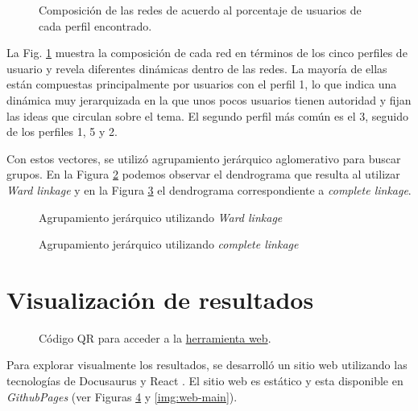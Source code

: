  \begin{figure}[htbp]
   \centering
   
    \caption{Composición de las redes de acuerdo al porcentaje de usuarios de cada perfil encontrado.}
    \label{fig:composition}
\end{figure}

La Fig. \ref{fig:composition} muestra la composición de cada red en términos de los cinco perfiles de usuario y revela diferentes dinámicas dentro de las redes. La mayoría de ellas están compuestas principalmente por usuarios con el perfil 1, lo que indica una dinámica muy jerarquizada en la que unos pocos usuarios tienen autoridad y fijan las ideas que circulan sobre el tema. El segundo perfil más común es el 3, seguido de los perfiles 1, 5 y 2.

Con estos vectores, se utilizó agrupamiento jerárquico aglomerativo para buscar grupos. En la Figura \ref{fig:dendro-ward} podemos observar el dendrograma que resulta al utilizar \textit{Ward linkage} y en la Figura \ref{fig:dendro-complete} el dendrograma correspondiente a \textit{complete linkage}.

 \begin{figure}[htbp]
   \centering
   
    \caption{Agrupamiento jerárquico utilizando \textit{Ward linkage}}
    \label{fig:dendro-ward}
\end{figure}

\newpage

 \begin{figure}[htbp]
   \centering
   
    \caption{Agrupamiento jerárquico utilizando \textit{complete linkage}}
    \label{fig:dendro-complete}
\end{figure}

\section{Visualización de resultados}
 \begin{figure}[htbp]
   \centering
   
    \caption{Código QR para acceder a la \href{https://roicort.github.io/OrbitalClustering}{herramienta web}.}
    \label{img:web-qr}
\end{figure}

Para explorar visualmente los resultados, se desarrolló un sitio web utilizando las tecnologías de Docusaurus \cite{meta_docusaurus_2022} y React \cite{meta_react_2013}. El sitio web es estático y esta disponible en \textit{GithubPages} (ver Figuras \ref{img:web-qr} y \ref{img:web-main}). 

